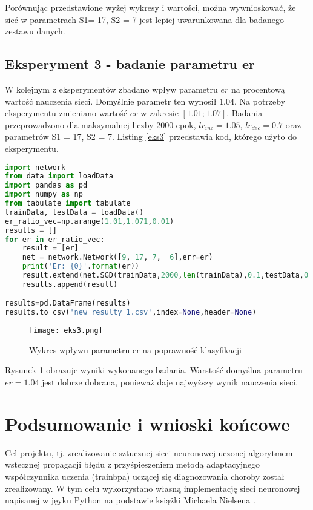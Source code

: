 \documentclass[12pt,twoside]{article}
\begin{document}
Porównując przedstawione wyżej wykresy i wartości, można wywnioskować, że sieć w parametrach S1= 17, S2 = 7 jest lepiej uwarunkowana dla badanego zestawu danych. 


\subsection{Eksperyment 3 - badanie parametru er}
W kolejnym z eksperymentów zbadano wpływ parametru $er$ na procentową wartość nauczenia sieci. Domyślnie parametr ten wynosił $1.04$. Na potrzeby eksperymentu zmieniano wartość $er$ w zakresie $[1.01; 1.07]$. Badania przeprowadzono dla maksymalnej liczby 2000 epok,  $lr_{inc}  = 1.05$, $lr_{dec} = 0.7$ oraz parametrów S1 = 17, S2 = 7. Listing \ref{eks3} przedstawia kod, którego użyto do eksperymentu.

\begin{lstlisting}[language=Python,caption=Algorytm realizujący eksperyment 3,label={eks3}]
import network
from data import loadData
import pandas as pd
import numpy as np
from tabulate import tabulate
trainData, testData = loadData()
er_ratio_vec=np.arange(1.01,1.071,0.01)
results = []
for er in er_ratio_vec:
    result = [er]
    net = network.Network([9, 17, 7,  6],err=er)
    print('Er: {0}'.format(er))
    result.extend(net.SGD(trainData,2000,len(trainData),0.1,testData,0.25,1.05,0.7))
    results.append(result)

results=pd.DataFrame(results)
results.to_csv('new_resulty_1.csv',index=None,header=None)

\end{lstlisting}

\begin{figure}[H]
\centering
\texttt{[image: eks3.png]}
\caption{Wykres wpływu parametru er na poprawność klasyfikacji}
\label{ryseks3}
\end{figure}

Rysunek \ref{ryseks3} obrazuje wyniki wykonanego badania. Warstość domyślna parametru $er = 1.04$ jest dobrze dobrana, ponieważ daje najwyższy wynik nauczenia sieci. 

\clearpage
\section{Podsumowanie i wnioski końcowe}

Cel projektu, tj. zrealizowanie sztucznej sieci neuronowej uczonej algorytmem wstecznej propagacji błędu z przyśpieszeniem metodą adaptacyjnego współczynnika uczenia (trainbpa) uczącej się diagnozowania choroby został zrealizowany. W tym celu wykorzystano własną implementację sieci neuronowej napisanej w jęyku Python na podstawie książki Michaela Nielsena \cite{nielsen}. 
\end{document}
